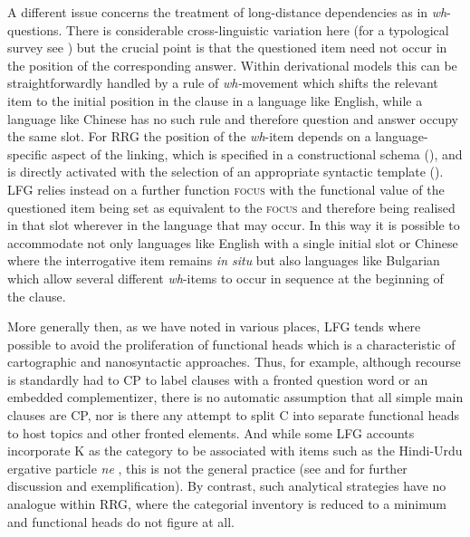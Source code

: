 \documentclass[output=paper,hidelinks]{langscibook}
\begin{document}
A different issue concerns the treatment of long-distance dependencies as in \textit{wh}{}-questions. There is considerable cross-linguistic variation here (for a typological survey see \citealt{Mycock2006}) but the crucial point is that the questioned item need not occur in the position of the corresponding answer. Within derivational models this can be straightforwardly handled by a rule of \textit{wh-}movement which shifts the relevant item to the initial position in the clause in a language like English, while a language like Chinese has no such rule and therefore question and answer occupy the same slot. For RRG the position of the \textit{wh}{}-item depends on a language-specific aspect of the linking, which is specified in a constructional schema (), and is directly activated with the selection of an appropriate syntactic template (). LFG relies instead on a further function \textsc{focus} with the functional value of the questioned item being set as equivalent to the \textsc{focus} and therefore being realised in that slot wherever in the language that may occur. In this way it is possible to accommodate not only languages like English with a single initial slot or Chinese where the interrogative item remains \textit{in situ} but also languages like Bulgarian which allow several different \textit{wh}{}-items to occur in sequence at the beginning of the clause.

More generally then, as we have noted in various places, LFG tends where possible to avoid the proliferation of functional heads which is a characteristic of cartographic and nanosyntactic approaches. Thus, for example, although recourse is standardly had to CP to label clauses with a fronted question word or an embedded complementizer, there is no automatic assumption that all simple main clauses are CP, nor is there any attempt to split C into separate functional heads to host topics and other fronted elements. And while some LFG accounts incorporate K as the category to be associated with items such as the Hindi-Urdu ergative particle \textit{ne} \citep[102-103]{DLM:LFG}, this is not the general practice (see \citealt{Vincent2021} and \citealt{PP2021} for further discussion and exemplification). By contrast, such analytical strategies have no analogue within RRG, where the categorial inventory is reduced to a minimum and functional heads do not figure at all.
\end{document}
